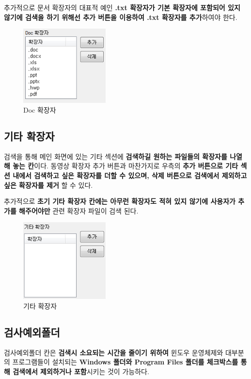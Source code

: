 \documentclass[a4paper, 13pt]{article} %
\begin{document}
		추가적으로 문서 확장자의 대표적 예인 \textbf{.txt 확장자가 기본 확장자에 포함되어 있지 않기에 검색을 하기 위해선 추가 버튼을 이용하여 .txt 확장자를 추가}하여야 한다.
		
		\begin{figure}[h]
			\centering
			\includegraphics[width=0.4\textwidth]{Figures/Doc}
			\caption{Doc 확장자}
			\label{fig:Doc}
		\end{figure}
	
		\subsection{기타 확장자}
		검색을 통해 메인 화면에 있는 기타 섹션에 \textbf{검색하길 원하는 파일들의 확장자를 나열해 놓는 칸}이다. 동영상 확장자 추가 버튼과 마찬가지로 우측의 \textbf{추가 버튼으로 기타 섹션 내에서 검색하고 싶은 확장자를 더할 수 있으며, 삭제 버튼으로 검색에서 제외하고 싶은 확장자를 제거} 할 수 있다.
		
		추가적으로 \textbf{초기 기타 확장자 칸에는 아무런 확장자도 적혀 있지 않기에 사용자가 추가를 해주어야만} 관련 확장자 파일이 검색 된다.
		
		\begin{figure}[h]
			\centering
			\includegraphics[width=0.4\textwidth]{Figures/etc}
			\caption{기타 확장자}
			\label{fig:etc}
		\end{figure}
	
		\newpage
	
		\subsection{검사예외폴더}	
		검사예외폴더 칸은 \textbf{검색시 소요되는 시간을 줄이기 위하여} 윈도우 운영체제와 대부분의 프로그램들이 설치되는 \textbf{ Windows 폴더와 Program Files 폴더를 체크박스를 통해 검색에서 제외하거나 포함}시키는 것이 가능하다.
		
\end{document}
